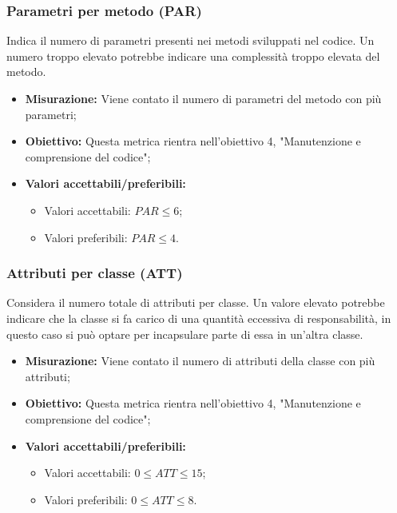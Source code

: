 \subsubsection{Parametri per metodo (PAR)}
Indica il numero di parametri presenti nei metodi sviluppati nel codice. Un numero troppo elevato potrebbe indicare una complessità troppo elevata del metodo.
\begin{itemize}
	\item \textbf{Misurazione:} Viene contato il numero di parametri del metodo con più parametri;
	\item \textbf{Obiettivo:} Questa metrica rientra nell'obiettivo 4, "Manutenzione e comprensione del codice";
	\item \textbf{Valori accettabili/preferibili: }
	\begin{itemize}
		\item Valori accettabili: $PAR \leq 6$;
		\item Valori preferibili: $PAR \leq 4$.
	\end{itemize}
\end{itemize}

\subsubsection{Attributi per classe (ATT)}
Considera il numero totale di attributi per classe. Un valore elevato potrebbe indicare che la classe si fa carico di una quantità eccessiva di responsabilità, in questo caso si può optare per incapsulare parte di essa in un'altra classe.
\begin{itemize}
	\item \textbf{Misurazione:} Viene contato il numero di attributi della classe con più attributi;
	\item \textbf{Obiettivo:} Questa metrica rientra nell'obiettivo 4, "Manutenzione e comprensione del codice";
	\item \textbf{Valori accettabili/preferibili: }
	\begin{itemize}
		\item Valori accettabili: $0\leq ATT \leq 15$;
		\item Valori preferibili: $0\leq ATT \leq 8$.
	\end{itemize}
\end{itemize}

